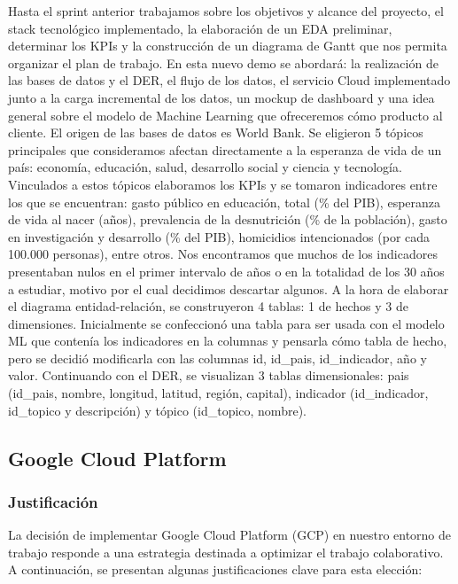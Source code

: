 \documentclass{other/docTemplate}
\begin{document}
Hasta el sprint anterior trabajamos sobre los objetivos y alcance del proyecto, el stack tecnológico implementado, la elaboración de un EDA preliminar, determinar los KPIs y la construcción de un diagrama de Gantt que nos permita organizar el plan de trabajo.
En esta nuevo demo se abordará: la realización de las bases de datos y el DER, el flujo de los datos, el servicio Cloud implementado junto a la carga incremental de los datos, un mockup de dashboard y una idea general sobre el modelo de Machine Learning que ofreceremos cómo producto al cliente.
El origen de las bases de datos es World Bank. Se eligieron 5 tópicos principales que consideramos afectan directamente a la esperanza de vida de un país: economía, educación, salud, desarrollo social y ciencia y tecnología. Vinculados a estos tópicos elaboramos los KPIs y se tomaron indicadores entre los que se encuentran: gasto público en educación, total (\% del PIB), esperanza de vida al nacer (años), prevalencia de la desnutrición (\% de la población), gasto en investigación y desarrollo (\% del PIB), homicidios intencionados (por cada 100.000 personas), entre otros.
Nos encontramos que muchos de los indicadores presentaban nulos en el primer intervalo de años o en la totalidad de los 30 años a estudiar, motivo por el cual decidimos descartar algunos.
A la hora de elaborar el diagrama entidad-relación, se construyeron 4 tablas: 1 de hechos y 3 de dimensiones. Inicialmente se confeccionó una tabla para ser usada con el modelo ML que contenía los indicadores en la columnas y pensarla cómo tabla de hecho, pero se decidió modificarla con las columnas  id, id\_pais, id\_indicador, año y valor. Continuando con el DER, se visualizan 3 tablas dimensionales: pais (id\_pais, nombre, longitud, latitud, región, capital), indicador (id\_indicador, id\_topico y descripción) y tópico (id\_topico, nombre).

\subsection{Google Cloud Platform}

\subsubsection{Justificación}

La decisión de implementar Google Cloud Platform (GCP) en nuestro entorno de trabajo responde a una estrategia destinada a optimizar el trabajo colaborativo. A continuación, se presentan algunas justificaciones clave para esta elección:
\end{document}
